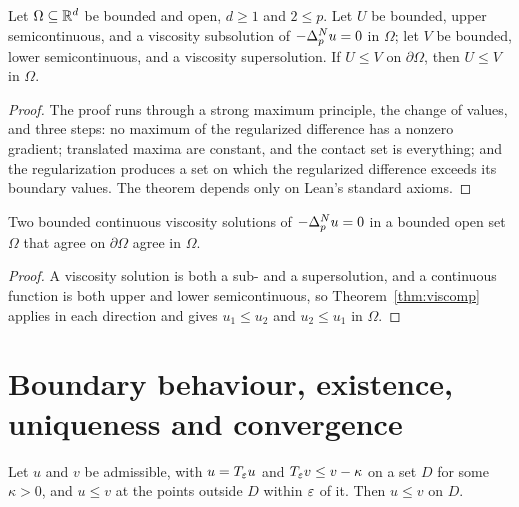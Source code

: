 \begin{theorem}\label{thm:viscomp}
\leanok
{}
Let $\Omega \subseteq \mathbb{R}^d$ be bounded and open, $d \ge 1$ and $2 \le p$. Let $U$
be bounded, upper semicontinuous, and a viscosity subsolution of
$-\Delta_p^{N} u = 0$ in $\Omega$; let $V$ be bounded, lower semicontinuous, and a
viscosity supersolution. If $U \le V$ on $\partial\Omega$, then $U \le V$ in
$\Omega$.
\end{theorem}

\begin{proof}
\leanok
{}
The proof runs through a strong maximum principle, the change of values, and three steps:
no maximum of the regularized difference has a nonzero gradient; translated maxima are constant, and the contact set is
everything; and the regularization produces a set on which
the regularized difference exceeds its boundary values.
The theorem depends only on Lean's standard axioms.
\end{proof}

\begin{theorem}\label{thm:viscunique}
\leanok
{}
Two bounded continuous viscosity solutions of $-\Delta_p^{N} u = 0$ in a bounded open
set $\Omega$ that agree on $\partial\Omega$ agree in $\Omega$.
\end{theorem}

\begin{proof}
\leanok
{}
A viscosity solution is both a sub- and a supersolution, and a continuous
function is both upper and lower semicontinuous, so
Theorem~\ref{thm:viscomp} applies in each direction and gives
$u_1 \le u_2$ and $u_2 \le u_1$ in $\Omega$.
\end{proof}


\chapter{Boundary behaviour, existence, uniqueness and convergence}

\begin{theorem}\label{thm:disccomp}
\leanok
Let $u$ and $v$ be admissible, with $u = T_\varepsilon u$ and $T_\varepsilon v \le v - \kappa$ on a
set $D$ for some $\kappa > 0$, and $u \le v$ at the points outside $D$ within
$\varepsilon$ of it. Then $u \le v$ on $D$.
\end{theorem}

